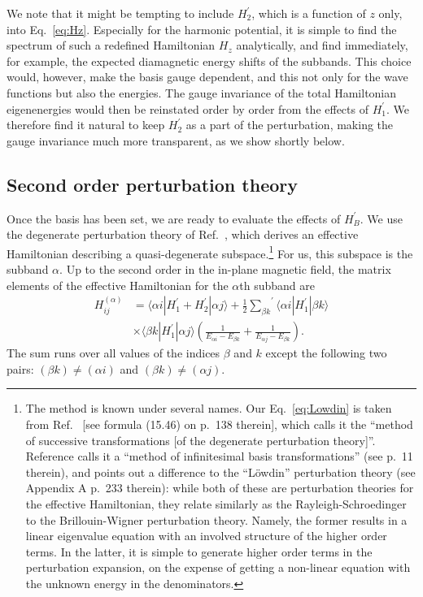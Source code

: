 \documentclass[aps,floatfix,twocolumn,showpacs,10pt,nofootinbib]{revtex4-1}
\newcommand{\be}{\begin{equation}}
\newcommand{\ee}{\end{equation}}
\begin{document}
We note that it might be tempting to include $H^\prime_2$, which is a function of $z$ only, into Eq.~\eqref{eq:Hz}. Especially for the harmonic potential, it is simple to find the spectrum of such a redefined Hamiltonian $H_z$ analytically, and find immediately, for example, the expected diamagnetic energy shifts of the subbands. This choice would, however, make the basis gauge dependent, and this not only for the wave functions but also the energies. The gauge invariance of the total Hamiltonian eigenenergies would then be reinstated order by order from the effects of $H^\prime_1$. We therefore find it natural to keep $H^\prime_2$ as a part of the perturbation, making the gauge invariance much more transparent, as we show shortly below.

\subsection{Second order perturbation theory \label{subsec:Lowdin}}

Once the basis has been set, we are ready to evaluate the effects of $H^\prime_B$. We use the degenerate perturbation theory of Ref.~, which derives an effective Hamiltonian describing a quasi-degenerate subspace.\footnote{The method is known under several names. Our Eq.~\eqref{eq:Lowdin} is taken from Ref.~ [see formula (15.46) on p.~138 therein], which calls it the ``method of successive transformations [of the degenerate perturbation theory]''. Reference  calls it a ``method of infinitesimal basis transformations'' (see p.~11 therein), and points out a difference to the ``L\"owdin'' perturbation theory (see Appendix A  p.~233 therein): while both of these are perturbation theories for the effective Hamiltonian, they relate similarly as the Rayleigh-Schroedinger to the Brillouin-Wigner perturbation theory. Namely, the former results in a linear eigenvalue equation with an involved structure of the higher order terms. In the latter, it is simple to generate higher order terms in the perturbation expansion, on the expense of getting a non-linear equation with the unknown energy in the denominators.}
For us, this subspace is the subband $\alpha$. Up to the second order in the in-plane magnetic field, the matrix elements of the effective Hamiltonian for the $\alpha$th subband are
\be
\begin{split}
H^{(\alpha)}_{i j} & =  \langle \alpha i | H^\prime_1+H^\prime_2 | \alpha j\rangle +
 \frac{1}{2} {\sum_{\beta k}}^\prime
 \langle \alpha i | H^\prime_1 | \beta k\rangle \\
&
\times  \langle \beta k | H^\prime_1 | \alpha j\rangle  \left( \frac{1}{E_{\alpha i}-E_{\beta k}}
+ \frac{1}{E_{\alpha j}-E_{\beta k}} \right).
\end{split}
\label{eq:Lowdin}
\ee
The sum runs over all values of the indices $\beta$ and $k$ except the following two pairs: $(\beta k) \neq (\alpha i)$ and $(\beta k) \neq (\alpha j)$.
\end{document}

